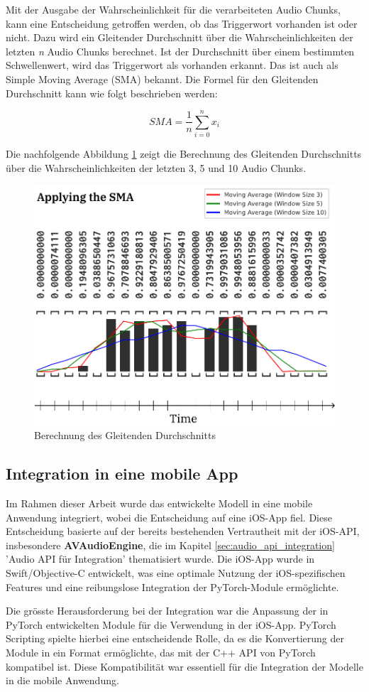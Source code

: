 \documentclass[11pt,a4paper]{article}
\begin{document}
\noindent
Mit der Ausgabe der Wahrscheinlichkeit für die verarbeiteten Audio Chunks, kann eine Entscheidung 
getroffen werden, ob das Triggerwort vorhanden ist oder nicht. Dazu wird ein Gleitender Durchschnitt 
über die Wahrscheinlichkeiten der letzten \textit{n} Audio Chunks berechnet. Ist der Durchschnitt 
über einem bestimmten Schwellenwert, wird das Triggerwort als vorhanden erkannt. Das ist auch als 
Simple Moving Average (SMA) bekannt. Die Formel für den Gleitenden Durchschnitt kann wie folgt 
beschrieben werden:

\begin{equation*}
	SMA = \frac{1}{n} \sum_{i=0}^{n} x_{i}
\end{equation*}

\noindent
Die nachfolgende Abbildung \ref{fig:sma} zeigt die Berechnung des Gleitenden Durchschnitts über 
die Wahrscheinlichkeiten der letzten 3, 5 und 10 Audio Chunks.

\begin{figure}[H]
	\centering
	\includegraphics[width=0.5\linewidth]{img/sma.pdf}
	\caption{Berechnung des Gleitenden Durchschnitts}
	\label{fig:sma}
\end{figure}


\subsection{Integration in eine mobile App}
Im Rahmen dieser Arbeit wurde das entwickelte Modell in eine mobile Anwendung integriert, wobei die 
Entscheidung auf eine iOS-App fiel. Diese Entscheidung basierte auf der bereits bestehenden 
Vertrautheit mit der iOS-API, insbesondere \textbf{AVAudioEngine}, die im Kapitel 
\ref{sec:audio_api_integration} 'Audio API für Integration' thematisiert wurde. Die iOS-App wurde in 
Swift/Objective-C entwickelt, was eine optimale Nutzung der iOS-spezifischen Features und eine 
reibungslose Integration der PyTorch-Module ermöglichte.

\noindent \newline
Die grösste Herausforderung bei der Integration war die Anpassung der in PyTorch entwickelten Module 
für die Verwendung in der iOS-App. PyTorch Scripting spielte hierbei eine entscheidende Rolle, da 
es die Konvertierung der Module in ein Format ermöglichte, das mit der C++ API von PyTorch 
kompatibel ist. Diese Kompatibilität war essentiell für die Integration der Modelle in die mobile 
Anwendung.
\end{document}
